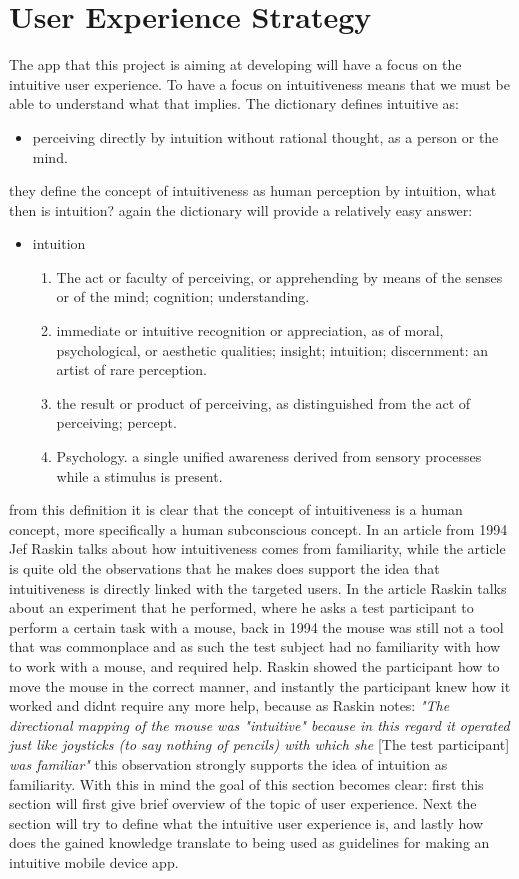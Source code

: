 \section{User Experience Strategy}
The app that this project is aiming at developing will have a focus on the intuitive user experience. To have a focus on intuitiveness means that we must be able to understand what that implies. The dictionary defines intuitive as: 
\begin{itemize}
\item perceiving directly by intuition without rational thought, as a person or the mind.
\end{itemize}
they define the concept of intuitiveness as human perception by intuition, what then is intuition? again the dictionary will provide a relatively easy answer: 
\begin{itemize}
\item intuition\\
\begin{enumerate}
\item The act or faculty of perceiving, or apprehending by means of the senses or of the mind; cognition; understanding.
\item immediate or intuitive recognition or appreciation, as of moral, psychological, or aesthetic qualities; insight; intuition; discernment:
an artist of rare perception.
\item the result or product of perceiving, as distinguished from the act of perceiving; percept.
\item Psychology. a single unified awareness derived from sensory processes while a stimulus is present.
\end{enumerate}
\end{itemize} from this definition it is clear that the concept of intuitiveness is a human concept, more specifically a human subconscious concept. In an article from 1994 Jef Raskin\cite{JRaskin} talks about how intuitiveness comes from familiarity, while the article is quite old the observations that he makes does support the idea that intuitiveness is directly linked with the targeted users. In the article Raskin talks about an experiment that he performed, where he asks a test participant to perform a certain task with a mouse, back in 1994 the mouse was still not a tool that was commonplace and as such the test subject had no familiarity with how to work with a mouse, and required help. Raskin showed the participant how to move the mouse in the correct manner, and instantly the participant knew how it worked and didnt require any more help, because as Raskin notes: \textit{"The directional mapping of the mouse was "intuitive" because in this regard it operated just like joysticks (to say nothing of pencils) with which she} [The test participant] \textit{was familiar"}\cite{JRaskin} this observation strongly supports the idea of intuition as familiarity. With this in mind the goal of this section becomes clear: first this section will first give brief overview of the topic of user experience. Next the section will try to define what the intuitive user experience is, and lastly how does the gained knowledge translate to being used as guidelines for making an intuitive mobile device app.  

